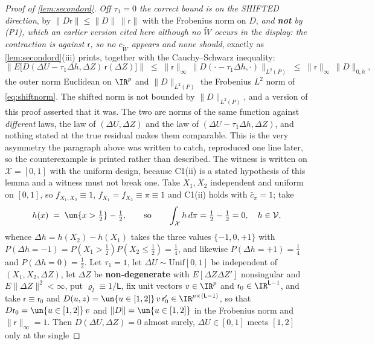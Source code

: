 \begin{proof}[Proof of \cref{lem:secondord}]
\emph{Off $\tau_1=0$ the correct bound is on the SHIFTED direction}, by
$\|D\mathsf r\|\le\|D\|\,\|\mathsf r\|$ with the Frobenius norm on $D$, \emph{and \textbf{not} by
\textup{(P1)}, which an earlier version cited here although no $\widetilde W$ occurs in the display: the
contraction is against $\mathsf r$, so no $c_{\widetilde W}$ appears and none should}, exactly as
\cref{lem:secondord}\textup{(iii)} prints, together with the Cauchy--Schwarz
inequality:
\begin{equation}\label{eq:crossshift}
\Big\|E\big[D(\Delta U-\tau_1\Delta h,\Delta Z)\,\mathsf r(\Delta Z)\big]\Big\|
\;\le\;\|\mathsf r\|_\infty\,\big\|D(\cdot-\tau_1\Delta h,\cdot)\big\|_{L^{2}(P)}
\;\le\;\|\mathsf r\|_\infty\,\|D\|_{0,h} ,
\end{equation}
the outer norm Euclidean on $\IR^{p}$ and $\|D\|_{L^{2}(P)}$ the Frobenius $L^{2}$ norm of
\eqref{eq:shiftnorm}.
The shifted norm is not bounded by $\|D\|_{L^{2}(P)}$, and a version of this proof asserted that
it was. The two are norms of the same function against \emph{different} laws, the law of
$(\Delta U,\Delta Z)$ and the law of $(\Delta U-\tau_1\Delta h,\Delta Z)$, and nothing stated at the
true residual makes them comparable. This is the very asymmetry the paragraph above was written to
catch, reproduced one line later, so the counterexample is printed rather than described.
The witness is written on $\mathcal X=[0,1]$ with the uniform design, because C1(ii) is a stated
hypothesis of this lemma and a witness must not break one. Take $X_1,X_2$ independent and uniform on
$[0,1]$, so $f_{X_1,X_2}\equiv1$, $f_{X_1}=f_{X_2}\equiv\pi\equiv1$ and C1(ii) holds with
$\bar c_\pi=1$; take
\[
h(x)\;=\;\un\{x>\tfrac12\}-\tfrac12 ,
\qquad\text{so}\qquad
\int_{\mathcal X}h\,d\pi=\tfrac12-\tfrac12=0,\quad h\in\mathcal V,
\]
whence $\Delta h=h(X_2)-h(X_1)$ takes the three values $\{-1,0,+1\}$ with
$P(\Delta h=-1)=P(X_1>\tfrac12)P(X_2\le\tfrac12)=\tfrac14$, and likewise $P(\Delta h=+1)=\tfrac14$ and
$P(\Delta h=0)=\tfrac12$. Let $\tau_1=1$, let $\Delta U\sim\mathrm{Unif}[0,1]$ be independent of
$(X_1,X_2,\Delta Z)$, let $\Delta Z$ be \textbf{non-degenerate} with $E[\Delta Z\Delta Z']$ nonsingular
and $E\|\Delta Z\|^{2}<\infty$, put $\varrho_l\equiv1/\mathsf L$, fix unit vectors
$v\in\IR^{p}$ and $\mathsf r_0\in\IR^{\mathsf L-1}$, and take
$\mathsf r\equiv\mathsf r_0$ and $D(u,z)=\un\{u\in[1,2]\}\,v\,\mathsf r_0'\in\IR^{p\times(\mathsf L-1)}$,
so that $D\mathsf r_0=\un\{u\in[1,2]\}\,v$ and $\|D\|=\un\{u\in[1,2]\}$ in the Frobenius norm and
$\|\mathsf r\|_\infty=1$.
Then $D(\Delta U,\Delta Z)=0$ almost surely, $\Delta U\in[0,1]$ meets $[1,2]$ only at the single

\end{proof}

